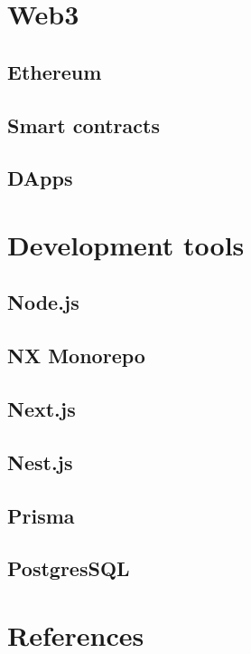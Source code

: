 \section{Web3}\label{sec:web3}

\subsection{Ethereum}\label{subsec:ethereum}
\subsection{Smart contracts}\label{subsec:smart-contracts}
\subsection{DApps}\label{subsec:dapps}

\section{Development tools}\label{sec:development-tools}

\subsection{Node.js}\label{subsec:node.js}
\subsection{NX Monorepo}\label{subsec:nx-monorepo}
\subsection{Next.js}\label{subsec:next.js}
\subsection{Nest.js}\label{subsec:nest.js}
\subsection{Prisma}\label{subsec:prisma}
\subsection{PostgresSQL}\label{subsec:postgressql}

\section{References}\label{sec:references}

